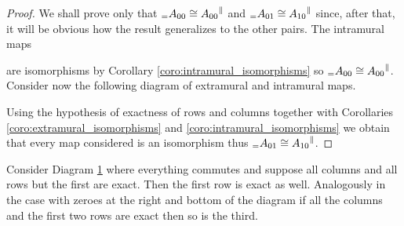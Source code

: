 \begin{proof}
  We shall prove only that \({}_={A_{00}}\cong{A_{00}}^{\parallel}\) and \({}_={A_{01}}\cong{A_{10}}^{\parallel}\) since, after that, it will be obvious how the result generalizes to the other pairs. The intramural maps
  \begin{center}
  \end{center}
  are isomorphisms by Corollary \ref{coro:intramural_isomorphisms} so \({}_={A_{00}}\cong{A_{00}}^{\parallel}\). Consider now the following diagram of extramural and intramural maps.
  \begin{center}
  \end{center}
  Using the hypothesis of exactness of rows and columns together with Corollaries \ref{coro:extramural_isomorphisms} and \ref{coro:intramural_isomorphisms} we obtain that every map considered is an isomorphism thus \({}_={A_{01}}\cong{A_{10}}^{\parallel}\).
\end{proof}

\begin{lemma}
  \label{lemma:33}
  Consider Diagram \ref{diagram:33} where everything commutes and suppose all columns and all rows but the first are exact. Then the first row is exact as well. Analogously in the case with zeroes at the right and bottom of the diagram if all the columns and the first two rows are exact then so is the third.
\end{lemma}

\begin{figure}[h]
  \begin{center}
  \end{center}
  \caption{}
  \label{diagram:33}
\end{figure}

